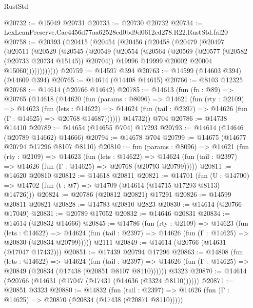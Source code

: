 \begin{lexlean}{RustStd}
\begin{coremodule}
@20732 := @15049 @20731
@20733 := @20730 @20732
@20734 := LexLeanPreserve.Cae4456d77aa62528ed0bd9d0612cd278.R22.RustStd.fal20
@20758 := @20393
    (@20415
      (@20454
        (@20456
          (@20458
            (@20479
              (@20497
                (@20511
                  (@20529
                    (@20545
                      (@20549
                        (@20554
                          (@20564
                            (@20569 (@20577 (@20582 (@20733 @20734 @15145)) @20704))
                            @19996
                            @19999
                            @20002
                            @20004
                            @15060))))))))))))
@20759 := @14597 @394
@20763 := @14599 (@14603 @394) (@14609 @394)
@20765 := @14614 (@14408 @14615)
@20766 := @8103 @12325
@20768 := @14614 (@20766 @14642)
@20785 := @14613
    (fun (fn : @89) =>
    @20765
      (@14618
        (@14620
          (fun (params : @8096) =>
          @14621
            (fun (rty : @2109) =>
            @14623
              (fun (lets : @14622) =>
              @14624 (fun (tail : @2397) => @14626 (fun (Γ : @14625) => @20768 @14687))))))
        @14732))
    @704
@20786 := @14738 @14410
@20789 := @14654 (@14655 @704) @17293
@20793 := @14614 (@14646 (@20789 @14662) @14666)
@20794 := @14678 @704
@20799 := @14675 (@14677 @20794 @17296 @8107 @8110)
@20810 := fun (params : @8096) =>
  @14621
    (fun (rty : @2109) =>
    @14623
      (fun (lets : @14622) =>
      @14624 (fun (tail : @2397) => @14626 (fun (Γ : @14625) => @20768 (@20793 @20799)))))
@20811 := @14620 @20810
@20812 := @14618 @20811
@20821 := @14701
    (fun (U : @14700) => @14702 (fun (t : @7) => @14709 (@14614 (@14715 @17293 @8113) @14726)))
@20824 := @20786 (@20812 @20821) @17291
@20826 := @14599 @20811 @20821
@20828 := @14783 @20810 @2823
@20830 := @14614 (@20766 @17049)
@20831 := @20789 @17052
@20832 := @14646 @20831
@20834 := @14614 (@20832 @14666)
@20845 := @14786
    (fun (rty : @2109) =>
    @14623
      (fun (lets : @14622) =>
      @14624 (fun (tail : @2397) => @14626 (fun (Γ : @14625) => @20830 (@20834 @20799)))))
    @2111
@20849 := @14614 (@20766 (@14631 (@17047 @17432)))
@20851 := @17439 @20794 @17296
@20863 := @14808
    (fun (lets : @14622) =>
    @14624
      (fun (tail : @2397) =>
      @14626 (fun (Γ : @14625) => @20849 (@20834 (@17438 (@20851 @8107 @8110))))))
    @3323
@20870 := @14614 (@20766 (@14631 (@17047 (@17431 (@14636 (@3324 @8110))))))
@20871 := @20851 @3323
@20880 := @14832
    (fun (tail : @2397) => @14626 (fun (Γ : @14625) => @20870 (@20834 (@17438 (@20871 @8110)))))

\end{coremodule}
\end{lexlean}
